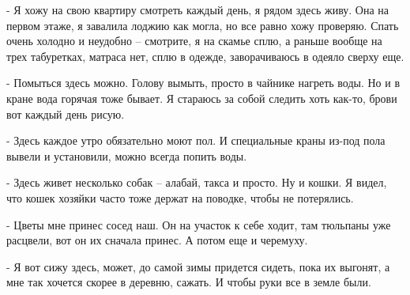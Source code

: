 - Я хожу на свою квартиру смотреть каждый день, я рядом здесь живу. Она на
первом этаже, я завалила лоджию как могла, но все равно хожу проверяю. Спать
очень холодно и неудобно – смотрите, я на скамье сплю, а раньше вообще на трех
табуретках, матраса нет, сплю в одежде, заворачиваюсь в одеяло сверху еще.

- Помыться здесь можно. Голову вымыть, просто в чайнике нагреть воды. Но и в
кране вода горячая тоже бывает. Я стараюсь за собой следить хоть как-то, брови
вот каждый день рисую.

- Здесь каждое утро обязательно моют пол. И специальные краны из-под пола
вывели и установили, можно всегда попить воды.

- Здесь живет несколько собак – алабай, такса и просто. Ну и кошки. Я видел,
что кошек хозяйки часто тоже держат на поводке, чтобы не потерялись.

- Цветы мне принес сосед наш. Он на участок к себе ходит, там тюльпаны уже
расцвели, вот он их сначала принес. А потом еще и черемуху.

- Я вот сижу здесь, может, до самой зимы придется сидеть, пока их выгонят, а
мне так хочется скорее в деревню, сажать. И чтобы руки все в земле были.

